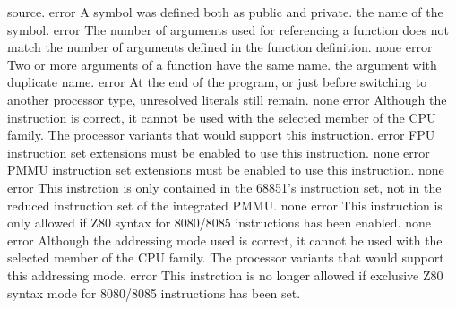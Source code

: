 \documentclass[12pt,twoside]{report}
\begin{document}
\begin{description}
{                source.}
               {error}
               {A symbol was defined both as public and private.}
               {the name of the symbol.}
               {error}
               {The number of arguments used for referencing a function
                does not match the number of arguments defined in the
                function definition.}
               {none}
               {error}
               {Two or more arguments of a function have the same name.}
               {the argument with duplicate name.}
               {error}
               {At the end of the program, or just before switching to
                another processor type, unresolved literals still remain.}
               {none}
               {error}
               {Although the instruction is correct, it cannot be used with
                the selected member of the CPU family.}
               {The processor variants that would support this
                instruction.}
               {error}
               {FPU instruction set extensions must be enabled to
                use this instruction.}
               {none}
               {error}
               {PMMU instruction set extensions must be enabled
                to use this instruction.}
               {none}
               {error}
               {This instrction is only contained in the 68851's
                instruction set, not in the reduced instruction
                set of the integrated PMMU.}
               {none}
               {error}
               {This instruction is only allowed if Z80 syntax
                for 8080/8085 instructions has been enabled.}
               {none}
               {error}
               {Although the addressing mode used is correct, it cannot be
                used with the selected member of the CPU family.}
               {The processor variants that would support this
                addressing mode.}
               {error}
               {This instrction is no longer allowed if exclusive
                Z80 syntax mode for 8080/8085 instructions has been set.}

\end{description}
\end{document}
